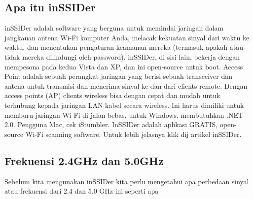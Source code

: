 \documentclass[conference]{IEEEtran}
\begin{document}
\subsection{Apa itu inSSIDer}
inSSIDer adalah software yang berguna untuk memindai jaringan dalam jangkauan antena Wi-Fi komputer Anda, melacak kekuatan sinyal dari waktu ke waktu, dan menentukan pengaturan keamanan mereka (termasuk apakah atau tidak mereka dilindungi oleh password). inSSIDer, di sisi lain, bekerja dengan mempesona pada kedua Vista dan XP, dan ini open-source untuk boot. Access Point adalah sebuah perangkat jaringan yang berisi sebuah transceiver dan antena untuk transmisi dan menerima sinyal ke dan dari clients remote. Dengan access points (AP) clients wireless bisa dengan cepat dan mudah untuk terhubung kepada jaringan LAN kabel secara wireless. Ini harus dimiliki untuk memburu jaringan Wi-Fi di jalan bebas, untuk Windows, membutuhkan .NET 2.0. Pengguna Mac, cek iStumbler. InSSIDer adalah aplikasi GRATIS, open-source Wi-Fi scanning software. Untuk lebih jelasnya klik dij artikel inSSIDer.

\subsection{Frekuensi 2.4GHz dan 5.0GHz}
Sebelum kita mengunakan inSSIDer kita perlu mengetahui apa perbedaan sinyal atau frekuensi dari 2.4 dan 5.0 GHz ini seperti apa 
\vspace{2pt}
\end{document}
